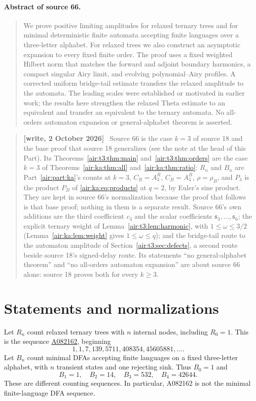 \documentclass[11pt,letterpaper]{article}
\numberwithin{equation}{section}
\theoremstyle{remark}
\newenvironment{writenote}{\par\smallskip\begin{quote}\small\textbf{[write, 2 October 2026]}\ }{\end{quote}\smallskip}
\begin{document}
\paragraph{Abstract of source 66.}
\begin{quote}\small
We prove positive limiting amplitudes for relaxed ternary trees and for minimal deterministic finite automata accepting finite languages over a three-letter alphabet. For relaxed trees we also construct an asymptotic expansion to every fixed finite order. The proof uses a fixed weighted Hilbert norm that matches the forward and adjoint boundary harmonics, a compact singular Airy limit, and evolving polynomial--Airy profiles. A corrected uniform bridge-tail estimate transfers the relaxed amplitude to the automata. The leading scales were established or motivated in earlier work; the results here strengthen the relaxed Theta estimate to an equivalent and transfer an equivalent to the ternary automata. No all-orders automaton expansion or general-alphabet theorem is asserted.
\end{quote}


\begin{writenote}
Source 66 is the case $k=3$ of source 18 and the base proof that source 18 generalizes (see the note at the head of this Part). Its Theorems~\ref{air:t3:thm:main} and~\ref{air:t3:thm:orders} are the case $k=3$ of Theorems~\ref{air:ka:thm:all} and~\ref{air:ka:thm:ratio}: $R_n$ and $B_n$ are Part~\ref{air:part:ka}'s counts at $k=3$, $C_R=A_3^R$, $C_B=A_3^B$, $\rho=\rho_B$, and $P_3$ is the product $P_B$ of \eqref{air:ka:eq:products} at $q=2$, by Euler's sine product. They are kept in source 66's normalization because the proof that follows is that base proof; nothing in them is a separate result. Source 66's own additions are the third coefficient $c_3$ and the scalar coefficients $\mathfrak s_3,\ldots,\mathfrak s_6$; the explicit ternary weight of Lemma~\ref{air:t3:lem:harmonic}, with $1\le\omega\le3/2$ (Lemma~\ref{air:ka:lem:weight} gives $1\le\omega\le q$); and the bridge-tail route to the automaton amplitude of Section~\ref{air:t3:sec:defects}, a second route beside source 18's signed-delay route. Its statements ``no general-alphabet theorem'' and ``no all-orders automaton expansion'' are about source 66 alone: source 18 proves both for every $k\ge3$.
\end{writenote}

\section{Statements and normalizations}\label{air:t3:sec:statements}
Let $R_n$ count relaxed ternary trees with $n$ internal nodes, including $R_0=1$. This is the sequence \href{https://oeis.org/A082162}{A082162}, beginning
\[
1,1,7,139,5711,408354,45605881,\ldots.
\]
Let $B_n$ count minimal DFAs accepting finite languages on a fixed three-letter alphabet, with $n$ transient states and one rejecting sink. Thus $B_0=1$ and
\[
B_1=1,\quad B_2=14,\quad B_3=532,\quad B_4=42644.
\]
These are different counting sequences. In particular, A082162 is not the minimal finite-language DFA sequence.
\end{document}

